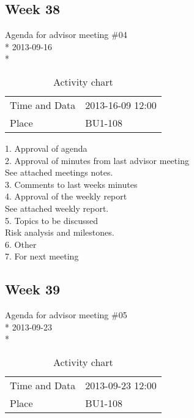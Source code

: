 \newpage
\subsection{Week 38}

\begin{center}
Agenda for advisor meeting \#04\\*
2013-09-16\\*
\end{center}

\begin{table}[H]
\begin{center}
\begin{tabular}{ l | l }
Time and Data & 2013-16-09 12:00 \\
Place & BU1-108 \\
\end{tabular}
\end{center}
\caption{Activity chart}
\label{table:activityChartAdvisorAgendaWeek38}
\end{table}


1. Approval of agenda \\
2. Approval of minutes from last advisor meeting \\
See attached meetings notes. \\
3. Comments to last weeks minutes \\
4. Approval of the weekly report \\
See attached weekly report. \\
5. Topics to be discussed \\
Risk analysis and milestones. \\
6. Other \\
7. For next meeting \\

\newpage
\subsection{Week 39}

\begin{center}
Agenda for advisor meeting \#05\\*
2013-09-23\\*
\end{center}

\begin{table}[H]
\begin{center}
\begin{tabular}{ l | l }
Time and Data & 2013-09-23 12:00 \\
Place & BU1-108 \\
\end{tabular}
\end{center}
\caption{Activity chart}
\label{table:activityChartAdvisorAgendaWeek39}
\end{table}


